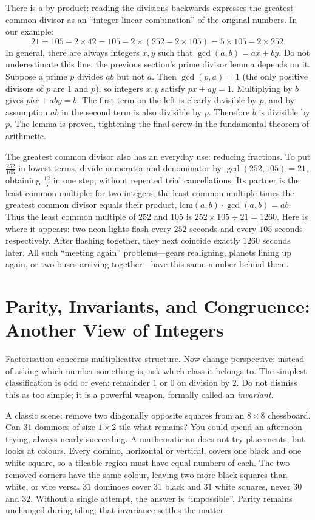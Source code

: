 There is a by-product: reading the divisions backwards expresses the greatest common divisor as an ``integer linear combination'' of the original numbers. In our example:
\[
21=105-2\times42=105-2\times(252-2\times105)=5\times105-2\times252.
\]
In general, there are always integers $x,y$ such that $\gcd(a,b)=ax+by$. Do not underestimate this line: the previous section's prime divisor lemma depends on it. Suppose a prime $p$ divides $ab$ but not $a$. Then $\gcd(p,a)=1$ (the only positive divisors of $p$ are $1$ and $p$), so integers $x,y$ satisfy $px+ay=1$. Multiplying by $b$ gives $pbx+aby=b$. The first term on the left is clearly divisible by $p$, and by assumption $ab$ in the second term is also divisible by $p$. Therefore $b$ is divisible by $p$. The lemma is proved, tightening the final screw in the fundamental theorem of arithmetic.

The greatest common divisor also has an everyday use: reducing fractions. To put $\frac{252}{105}$ in lowest terms, divide numerator and denominator by $\gcd(252,105)=21$, obtaining $\frac{12}{5}$ in one step, without repeated trial cancellations. Its partner is the least common multiple: for two integers, the least common multiple times the greatest common divisor equals their product, $\mathrm{lcm}(a,b)\cdot\gcd(a,b)=ab$. Thus the least common multiple of $252$ and $105$ is $252\times105\div21=1260$. Here is where it appears: two neon lights flash every $252$ seconds and every $105$ seconds respectively. After flashing together, they next coincide exactly $1260$ seconds later. All such ``meeting again'' problems---gears realigning, planets lining up again, or two buses arriving together---have this same number behind them.

\section{Parity, Invariants, and Congruence: Another View of Integers}

Factorisation concerns multiplicative structure. Now change perspective: instead of asking which number something is, ask which class it belongs to. The simplest classification is odd or even: remainder $1$ or $0$ on division by $2$. Do not dismiss this as too simple; it is a powerful weapon, formally called an \emph{invariant}.

A classic scene: remove two diagonally opposite squares from an $8\times8$ chessboard. Can $31$ dominoes of size $1\times2$ tile what remains? You could spend an afternoon trying, always nearly succeeding. A mathematician does not try placements, but looks at colours. Every domino, horizontal or vertical, covers one black and one white square, so a tileable region must have equal numbers of each. The two removed corners have the same colour, leaving two more black squares than white, or vice versa. $31$ dominoes cover $31$ black and $31$ white squares, never $30$ and $32$. Without a single attempt, the answer is ``impossible''. Parity remains unchanged during tiling; that invariance settles the matter.

